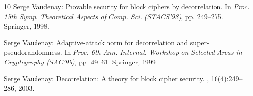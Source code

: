 \begin{thebibliography}{10}
{\sc Serge Vaudenay}: Provable security for block ciphers by decorrelation.
\newblock In {\em Proc. 15th Symp. Theoretical Aspects of Comp. Sci.
  (STACS'98)}, pp. 249--275. Springer, 1998.

{\sc Serge Vaudenay}: Adaptive-attack norm for decorrelation and
  super-pseudorandomness.
\newblock In {\em Proc. 6th Ann. Internat. Workshop on Selected Areas in
  Cryptography (SAC'99)}, pp. 49--61. Springer, 1999.
\newblock [\epfmtdoi{10.1007/3-540-46513-8\_4}]

{\sc Serge Vaudenay}: Decorrelation: A theory for block cipher security.
, 16(4):249--286, 2003.
\newblock [\epfmtdoi{10.1007/s00145-003-0220-6}]

\end{thebibliography}

